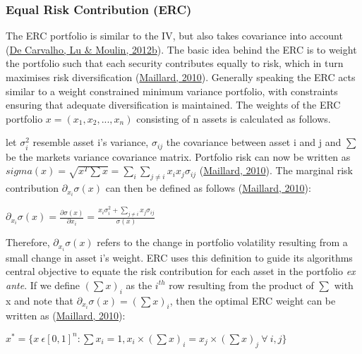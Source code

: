 \documentclass[11pt,preprint, authoryear]{elsarticle}
\numberwithin{equation}{section}
\numberwithin{figure}{section}
\numberwithin{table}{section}
\begin{document}
\hypertarget{equal-risk-contribution-erc}{%
\subsubsection{Equal Risk Contribution
(ERC)}\label{equal-risk-contribution-erc}}

The ERC portfolio is similar to the IV, but also takes covariance into
account (\protect\hyperlink{ref-leote}{De Carvalho, Lu \& Moulin,
2012b}). The basic idea behind the ERC is to weight the portfolio such
that each security contributes equally to risk, which in turn maximises
risk diversification (\protect\hyperlink{ref-maillard2010}{Maillard,
2010}). Generally speaking the ERC acts similar to a weight constrained
minimum variance portfolio, with constraints ensuring that adequate
diversification is maintained. The weights of the ERC portfolio
\(x=(x_1,x_2,...,x_n)\) consisting of n assets is calculated as follows.

let \(\sigma_i^2\) resemble asset i's variance, \(\sigma_{ij}\) the
covariance between asset i and j and \(\sum\) be the markets variance
covariance matrix. Portfolio risk can now be written as
\(sigma(x)=\sqrt{x^T\sum x}=\sum_i\sum_{j\neq i}x_ix_j\sigma_{ij}\)
(\protect\hyperlink{ref-maillard2010}{Maillard, 2010}). The marginal
risk contribution \(\partial_{x_i}\sigma(x)\) can then be defined as
follows (\protect\hyperlink{ref-maillard2010}{Maillard, 2010}):

\(\partial_{x_i}\sigma(x)=\frac{\partial\sigma(x)}{\partial x_i}=\frac{x_i\sigma_i^2+\sum_{j\neq i}x_j\sigma_{ij}}{\sigma(x)}\)

Therefore, \(\partial_{x_i}\sigma(x)\) refers to the change in portfolio
volatility resulting from a small change in asset i's weight. ERC uses
this definition to guide its algorithms central objective to equate the
risk contribution for each asset in the portfolio \emph{ex ante}. If we
define \((\sum x)_i\) as the \(i^{th}\) row resulting from the product
of \(\sum\) with x and note that \(\partial_{x_i}\sigma(x)=(\sum x)_i\),
then the optimal ERC weight can be written as
(\protect\hyperlink{ref-maillard2010}{Maillard, 2010}):

\(x^*=\{x \ \epsilon[0,1]^n:\sum x_i=1, x_i \times (\sum x)_i=x_j \times (\sum x)_j \ \forall \ i,j \}\)
\end{document}
